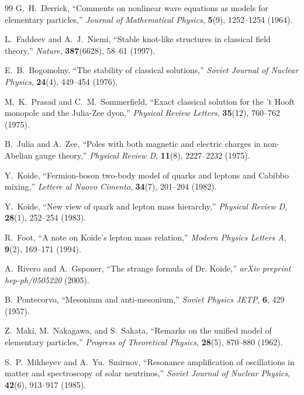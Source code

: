 \documentclass[12pt,a4paper]{article}
\begin{document}
\begin{thebibliography}{99}
	G.~H.~Derrick, 
	``Comments on nonlinear wave equations as models for elementary particles,''
	\textit{Journal of Mathematical Physics}, \textbf{5}(9), 1252--1254 (1964).
	
	L.~Faddeev and A.~J.~Niemi, 
	``Stable knot-like structures in classical field theory,''
	\textit{Nature}, \textbf{387}(6628), 58--61 (1997).
	
	E.~B.~Bogomolny, 
	``The stability of classical solutions,''
	\textit{Soviet Journal of Nuclear Physics}, \textbf{24}(4), 449--454 (1976).
	
	M.~K.~Prasad and C.~M.~Sommerfield, 
	``Exact classical solution for the 't Hooft monopole and the Julia-Zee dyon,''
	\textit{Physical Review Letters}, \textbf{35}(12), 760--762 (1975).
	
	B.~Julia and A.~Zee, 
	``Poles with both magnetic and electric charges in non-Abelian gauge theory,''
	\textit{Physical Review D}, \textbf{11}(8), 2227--2232 (1975).
	
	Y.~Koide, 
	``Fermion-boson two-body model of quarks and leptons and Cabibbo mixing,''
	\textit{Lettere al Nuovo Cimento}, \textbf{34}(7), 201--204 (1982).
	
	Y.~Koide, 
	``New view of quark and lepton mass hierarchy,''
	\textit{Physical Review D}, \textbf{28}(1), 252--254 (1983).
	
	R.~Foot, 
	``A note on Koide's lepton mass relation,''
	\textit{Modern Physics Letters A}, \textbf{9}(2), 169--171 (1994).
	
	A.~Rivero and A.~Gsponer, 
	``The strange formula of Dr. Koide,''
	\textit{arXiv preprint hep-ph/0505220} (2005).
	
	B.~Pontecorvo, 
	``Mesonium and anti-mesonium,''
	\textit{Soviet Physics JETP}, \textbf{6}, 429 (1957).
	
	Z.~Maki, M.~Nakagawa, and S.~Sakata, 
	``Remarks on the unified model of elementary particles,''
	\textit{Progress of Theoretical Physics}, \textbf{28}(5), 870--880 (1962).
	
	S.~P.~Mikheyev and A.~Yu.~Smirnov, 
	``Resonance amplification of oscillations in matter and spectroscopy of solar neutrinos,''
	\textit{Soviet Journal of Nuclear Physics}, \textbf{42}(6), 913--917 (1985).
	

\end{thebibliography}
\end{document}
